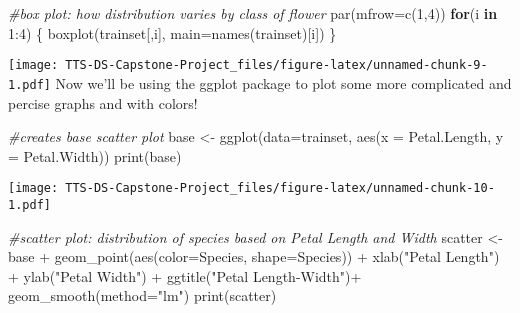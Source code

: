 \documentclass[
]{article}
\newenvironment{Shaded}{\begin{snugshade}}{\end{snugshade}}
\newcommand{\AttributeTok}[1]{\textcolor[rgb]{0.77,0.63,0.00}{#1}}
\newcommand{\CommentTok}[1]{\textcolor[rgb]{0.56,0.35,0.01}{\textit{#1}}}
\newcommand{\ControlFlowTok}[1]{\textcolor[rgb]{0.13,0.29,0.53}{\textbf{#1}}}
\newcommand{\DecValTok}[1]{\textcolor[rgb]{0.00,0.00,0.81}{#1}}
\newcommand{\FunctionTok}[1]{\textcolor[rgb]{0.00,0.00,0.00}{#1}}
\newcommand{\NormalTok}[1]{#1}
\newcommand{\OtherTok}[1]{\textcolor[rgb]{0.56,0.35,0.01}{#1}}
\newcommand{\SpecialCharTok}[1]{\textcolor[rgb]{0.00,0.00,0.00}{#1}}
\newcommand{\StringTok}[1]{\textcolor[rgb]{0.31,0.60,0.02}{#1}}
\begin{document}
\begin{Shaded}
\begin{Highlighting}[]
\CommentTok{\#box plot: how distribution varies by class of flower}
\FunctionTok{par}\NormalTok{(}\AttributeTok{mfrow=}\FunctionTok{c}\NormalTok{(}\DecValTok{1}\NormalTok{,}\DecValTok{4}\NormalTok{))}
  \ControlFlowTok{for}\NormalTok{(i }\ControlFlowTok{in} \DecValTok{1}\SpecialCharTok{:}\DecValTok{4}\NormalTok{) \{}
  \FunctionTok{boxplot}\NormalTok{(trainset[,i], }\AttributeTok{main=}\FunctionTok{names}\NormalTok{(trainset)[i])}
\NormalTok{\}}
\end{Highlighting}
\end{Shaded}

\texttt{[image: TTS-DS-Capstone-Project\_files/figure-latex/unnamed-chunk-9-1.pdf]}
Now we'll be using the ggplot package to plot some more complicated and
percise graphs and with colors!

\begin{Shaded}
\begin{Highlighting}[]
\CommentTok{\#creates base scatter plot}
\NormalTok{base }\OtherTok{\textless{}{-}} \FunctionTok{ggplot}\NormalTok{(}\AttributeTok{data=}\NormalTok{trainset, }\FunctionTok{aes}\NormalTok{(}\AttributeTok{x =}\NormalTok{ Petal.Length, }\AttributeTok{y =}\NormalTok{ Petal.Width))}
\FunctionTok{print}\NormalTok{(base)}
\end{Highlighting}
\end{Shaded}

\texttt{[image: TTS-DS-Capstone-Project\_files/figure-latex/unnamed-chunk-10-1.pdf]}

\begin{Shaded}
\begin{Highlighting}[]
\CommentTok{\#scatter plot: distribution of species based on Petal Length and Width}
\NormalTok{scatter }\OtherTok{\textless{}{-}}\NormalTok{base }\SpecialCharTok{+} 
    \FunctionTok{geom\_point}\NormalTok{(}\FunctionTok{aes}\NormalTok{(}\AttributeTok{color=}\NormalTok{Species, }\AttributeTok{shape=}\NormalTok{Species)) }\SpecialCharTok{+}
    \FunctionTok{xlab}\NormalTok{(}\StringTok{"Petal Length"}\NormalTok{) }\SpecialCharTok{+}
    \FunctionTok{ylab}\NormalTok{(}\StringTok{"Petal Width"}\NormalTok{) }\SpecialCharTok{+}
    \FunctionTok{ggtitle}\NormalTok{(}\StringTok{"Petal Length{-}Width"}\NormalTok{)}\SpecialCharTok{+}
    \FunctionTok{geom\_smooth}\NormalTok{(}\AttributeTok{method=}\StringTok{"lm"}\NormalTok{)}
\FunctionTok{print}\NormalTok{(scatter)}
\end{Highlighting}
\end{Shaded}
\end{document}
